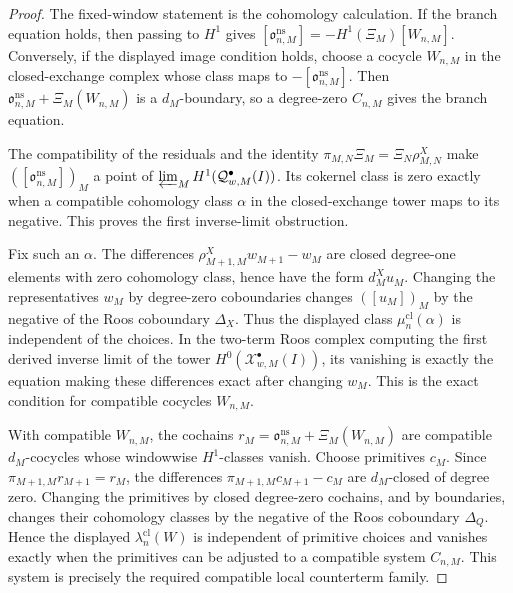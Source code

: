 \begin{proof}
  The fixed-window statement is the cohomology calculation.  If the
  branch equation holds, then passing to \(H^1\) gives
  \([\mathfrak o^{\mathrm{ns}}_{n,M}]
  =-H^1(\Xi_M)[W_{n,M}]\).  Conversely, if the displayed image condition
  holds, choose a cocycle \(W_{n,M}\) in the closed-exchange complex whose
  class maps to \(-[\mathfrak o^{\mathrm{ns}}_{n,M}]\).  Then
  \(\mathfrak o^{\mathrm{ns}}_{n,M}+\Xi_M(W_{n,M})\) is a
  \(d_M\)-boundary, so a degree-zero \(C_{n,M}\) gives the branch
  equation.

  The compatibility of the residuals and the identity
  \(\pi_{M,N}\Xi_M=\Xi_N\rho^X_{M,N}\) make
  \(([\mathfrak o^{\mathrm{ns}}_{n,M}])_M\) a point of
  \(\varprojlim_M H^1(\mathcal Q^\bullet_{w,M}(I))\).  Its cokernel class
  is zero exactly when a compatible cohomology class \(\alpha\) in the
  closed-exchange tower maps to its negative.  This proves the first
  inverse-limit obstruction.

  Fix such an \(\alpha\).  The differences
  \(\rho^X_{M+1,M}w_{M+1}-w_M\) are closed degree-one elements with zero
  cohomology class, hence have the form \(d^X_M u_M\).  Changing the
  representatives \(w_M\) by degree-zero coboundaries changes
  \(([u_M])_M\) by the negative of the Roos coboundary \(\Delta_X\).  Thus
  the displayed class \(\mu^{\mathrm{cl}}_n(\alpha)\) is independent of the
  choices.  In
  the two-term Roos complex computing the first derived inverse limit of
  the tower \(H^0(\mathcal X^\bullet_{w,M}(I))\), its vanishing is exactly
  the equation making these differences exact after changing
  \(w_M\).  This is the exact condition for compatible cocycles
  \(W_{n,M}\).

  With compatible \(W_{n,M}\), the cochains
  \(r_M=\mathfrak o^{\mathrm{ns}}_{n,M}+\Xi_M(W_{n,M})\) are compatible
  \(d_M\)-cocycles whose windowwise \(H^1\)-classes vanish.  Choose
  primitives \(c_M\).  Since \(\pi_{M+1,M}r_{M+1}=r_M\), the differences
  \(\pi_{M+1,M}c_{M+1}-c_M\) are \(d_M\)-closed of degree zero.  Changing
  the primitives by closed degree-zero cochains, and by boundaries, changes
  their cohomology classes by the negative of the Roos coboundary
  \(\Delta_Q\).  Hence the
  displayed \(\lambda^{\mathrm{cl}}_n(W)\) is independent of primitive
  choices and vanishes exactly when the primitives can be adjusted to a
  compatible system \(C_{n,M}\).  This system is precisely the required
  compatible local counterterm family.


\end{proof}
